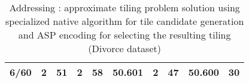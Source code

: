 \begin{table}[]
\begin{tabular}{rrrrrrrrrr}
6/60                                           & 2                                       & 51                                          & 2                      & 58                         & 50.601                    & 2                                           & 47                                              & 50.600                                         & 30                          \\ \hline                         
\end{tabular}
\caption{Addressing \qsix: approximate tiling problem  solution using specialized native algorithm for tile candidate generation and ASP encoding for selecting the resulting tiling (Divorce dataset)}
\label{til:div}
\end{table}


